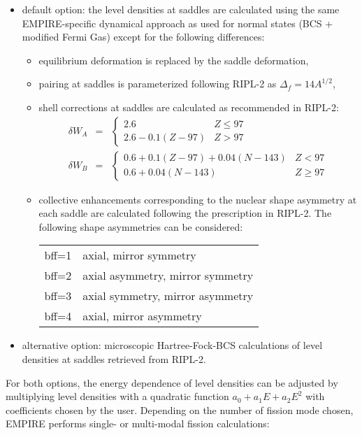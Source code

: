 \begin{itemize}
\item default option: the level densities at saddles are calculated using
the same EMPIRE-specific dynamical approach as used for normal states (BCS +
modified Fermi Gas) except for the following differences:

\begin{itemize}
\item equilibrium deformation is replaced by the saddle deformation,

\item pairing at saddles is parameterized following RIPL-2 as $%
\Delta_{f}=14A^{1/2}$,

\item shell corrections at saddles are calculated as recommended in RIPL-2:
\begin{eqnarray}
\delta W_{A}&=&\left\{
\begin{array}{lr}
2.6 & Z\leq97 \\
2.6-0.1(Z-97) & Z>97%
\end{array}%
\right.  \nonumber \\
\delta W_{B}&=&\left\{
\begin{array}{lr}
0.6+0.1(Z-97)+0.04(N-143) & Z<97 \\
0.6+0.04(N-143) & Z\geq97%
\end{array}%
\right.  \nonumber
\end{eqnarray}

\item collective enhancements corresponding to the nuclear shape asymmetry
at each saddle are calculated following the prescription in RIPL-2. The
following shape asymmetries can be considered:
\begin{tabular}{ll}
bff=1 & axial, mirror symmetry\tabularnewline bff=2 & axial asymmetry,
mirror symmetry\tabularnewline bff=3 & axial symmetry, mirror asymmetry%
\tabularnewline bff=4 & axial, mirror asymmetry \tabularnewline%
\end{tabular}
\end{itemize}

\item alternative option: microscopic Hartree-Fock-BCS calculations of level
densities at saddles retrieved from RIPL-2.
\end{itemize}

For both options, the energy dependence of level densities can be adjusted
by multiplying level densities with a quadratic function $%
a_{0}+a_{1}E+a_{2}E^{2}$ with coefficients chosen by the user. Depending on
the number of fission mode chosen, EMPIRE performs single- or multi-modal
fission calculations:

